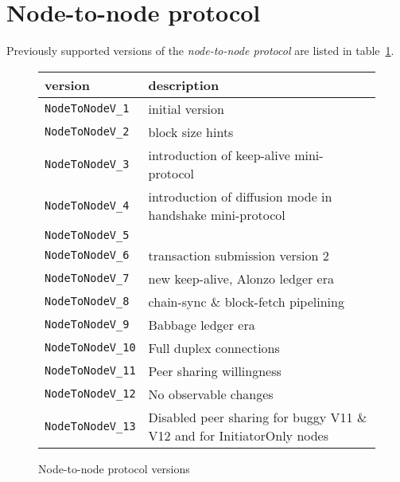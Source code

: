 \documentclass{report}
\newcommand{\header}[1]{\textbf{#1}}
\begin{document}
\section{Node-to-node protocol}
Previously supported versions of the \textit{node-to-node protocol} are listed
in table~\ref{table:historical-node-to-node-protocol-versions}.
\begin{figure}[h]
  \begin{center}
    \begin{tabular}{l|l}
      \header{version}        & \header{description} \\\hline
      \texttt{NodeToNodeV\_1} & initial version \\
      \texttt{NodeToNodeV\_2} & block size hints \\
      \texttt{NodeToNodeV\_3} & introduction of keep-alive mini-protocol \\
      \texttt{NodeToNodeV\_4} & introduction of diffusion mode in handshake mini-protocol \\
      \texttt{NodeToNodeV\_5} & \\
      \texttt{NodeToNodeV\_6} & transaction submission version 2 \\
      \texttt{NodeToNodeV\_7} & new keep-alive, Alonzo ledger era \\
      \texttt{NodeToNodeV\_8} & chain-sync \& block-fetch pipelining \\
      \texttt{NodeToNodeV\_9} & Babbage ledger era \\
      \texttt{NodeToNodeV\_10} & Full duplex connections \\
      \texttt{NodeToNodeV\_11} & Peer sharing willingness \\
      \texttt{NodeToNodeV\_12} & No observable changes \\
      \texttt{NodeToNodeV\_13} & Disabled peer sharing for buggy V11 \& V12 and for InitiatorOnly nodes \\
    \end{tabular}
    \caption{Node-to-node protocol versions}
    \label{table:historical-node-to-node-protocol-versions}
  \end{center}
\end{figure}
\end{document}
